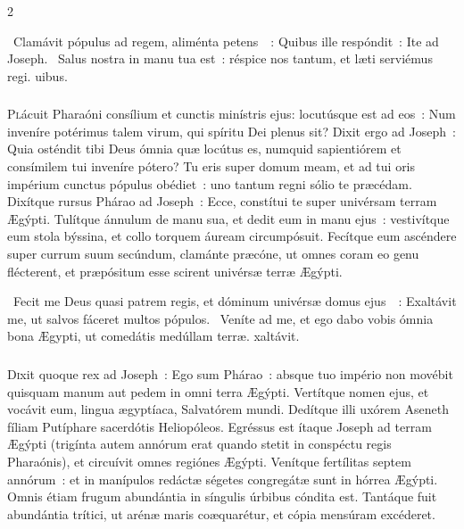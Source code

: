 \documentclass[9pt,twoside]{extarticle}
\begin{document}
\begin{multicols}{2}
{{\begin{tightlist}{}
\item {}~Clamávit pópulus ad regem, aliménta petens~~: \textred{*} Quibus ille respóndit~: Ite ad Joseph. ~Salus nostra in manu tua est~: réspice nos tantum, et læti serviémus regi. uibus.
\end{tightlist}

\subsubsection*{\center {}}
\lettrine{P}lácuit Pharaóni consílium et cunctis minístris ejus:
locutúsque est ad eos~: Num inveníre potérimus talem virum, qui spíritu Dei plenus sit?
Dixit ergo ad Joseph~: Quia osténdit tibi Deus ómnia quæ locútus es, numquid sapientiórem et consímilem tui inveníre pótero?
Tu eris super domum meam, et ad tui oris impérium cunctus pópulus obédiet~: uno tantum regni sólio te præcédam.
Dixítque rursus Phárao ad Joseph~: Ecce, constítui te super univérsam terram Ægýpti.
Tulítque ánnulum de manu sua, et dedit eum in manu ejus~: vestivítque eum stola býssina, et collo torquem áuream circumpósuit.
Fecítque eum ascéndere super currum suum secúndum, clamánte præcóne, ut omnes coram eo genu flécterent, et præpósitum esse scirent univérsæ terræ Ægýpti.

\begin{tightlist}{}
\item {}~Fecit me Deus quasi patrem regis, et dóminum univérsæ domus ejus~~: \textred{*} Exaltávit me, ut salvos fáceret multos pópulos. ~Veníte ad me, et ego dabo vobis ómnia bona Ægypti, ut comedátis medúllam terræ. xaltávit.
\end{tightlist}

\subsubsection*{\center {}}
\lettrine{D}ixit quoque rex ad Joseph~: Ego sum Phárao~: absque tuo império non movébit quisquam manum aut pedem in omni terra Ægýpti.
Vertítque nomen ejus, et vocávit eum, lingua ægyptíaca, Salvatórem mundi. Dedítque illi uxórem Aseneth fíliam Putíphare sacerdótis Heliopóleos. Egréssus est ítaque Joseph ad terram Ægýpti
(trigínta autem annórum erat quando stetit in conspéctu regis Pharaónis), et circuívit omnes regiónes Ægýpti.
Venítque fertílitas septem annórum~: et in manípulos redáctæ ségetes congregátæ sunt in hórrea Ægýpti.
Omnis étiam frugum abundántia in síngulis úrbibus cóndita est.
Tantáque fuit abundántia trítici, ut arénæ maris coæquarétur, et cópia mensúram excéderet.

}}
\end{multicols}
\end{document}
